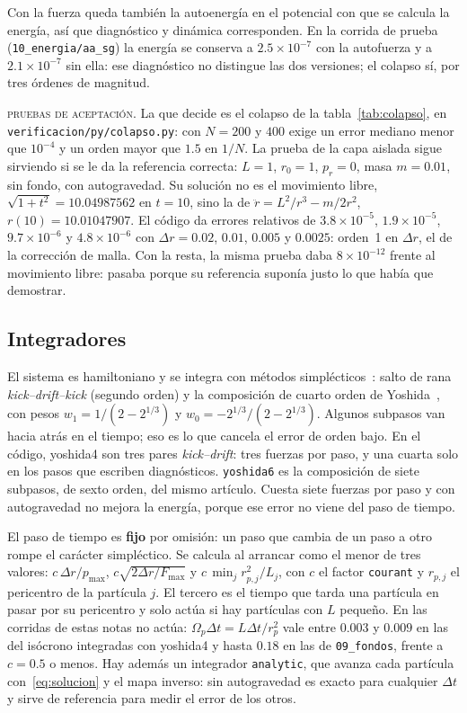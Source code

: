 \documentclass[11pt,a4paper]{article}
\newcommand{\rp}{p_r}
\begin{document}
Con la fuerza queda también la autoenergía en el potencial con que se calcula la energía,
así que diagnóstico y dinámica corresponden. En la corrida de prueba
(\texttt{10\_energia/aa\_sg}) la energía se conserva a $2.5\times10^{-7}$ con la
autofuerza y a $2.1\times10^{-7}$ sin ella: ese diagnóstico no distingue las dos
versiones; el colapso sí, por tres órdenes de magnitud.

\begin{aviso}
\textsc{pruebas de aceptación.} La que decide es el colapso de la
tabla~\ref{tab:colapso}, en \texttt{verificacion/py/colapso.py}: con $N=200$ y $400$
exige un error mediano menor que $10^{-4}$ y un orden mayor que $1.5$ en $1/N$. La
prueba de la capa aislada sigue sirviendo si se le da la referencia correcta: $L=1$,
$r_0=1$, $\rp=0$, masa $m=0.01$, sin fondo, con autogravedad. Su solución no es el
movimiento libre, $\sqrt{1+t^{2}}=10.04987562$ en $t=10$, sino la de
$\ddot r=L^{2}/r^{3}-m/2r^{2}$, $r(10)=10.01047907$. El código da errores relativos de
$3.8\times10^{-5}$, $1.9\times10^{-5}$, $9.7\times10^{-6}$ y $4.8\times10^{-6}$ con
$\Delta r=0.02$, $0.01$, $0.005$ y $0.0025$: orden~1 en $\Delta r$, el de la corrección
de malla. Con la resta, la misma prueba daba $8\times10^{-12}$ frente al movimiento libre:
pasaba porque su referencia suponía justo lo que había que demostrar.
\end{aviso}

\subsection{Integradores}

El sistema es hamiltoniano y se integra con métodos simplécticos~\cite{hairer2006}:
salto de rana \emph{kick--drift--kick} (segundo orden) y la composición de cuarto orden
de Yoshida~\cite{yoshida1990}, con pesos $w_1=1/(2-2^{1/3})$ y
$w_0=-2^{1/3}/(2-2^{1/3})$. Algunos subpasos van hacia atrás en el tiempo; eso es lo que
cancela el error de orden bajo. En el código, yoshida4 son tres pares \emph{kick--drift}:
tres fuerzas por paso, y una cuarta solo en los pasos que escriben diagnósticos.
\texttt{yoshida6} es la composición de siete subpasos, de sexto orden, del mismo artículo.
Cuesta siete fuerzas por paso y con autogravedad no mejora la energía, porque ese error no
viene del paso de tiempo.

El paso de tiempo es \textbf{fijo} por omisión: un paso que cambia de un paso a otro rompe
el carácter simpléctico. Se calcula al arrancar como el menor de tres valores:
$c\,\Delta r/p_{\max}$, $c\sqrt{2\Delta r/F_{\max}}$ y $c\,\min_j r_{p,j}^2/L_j$, con $c$ el
factor \texttt{courant} y $r_{p,j}$ el pericentro de la partícula $j$. El tercero es el
tiempo que tarda una partícula en pasar por su pericentro y solo actúa si hay partículas
con $L$ pequeño. En las corridas de estas notas no actúa: $\Omega_p\Delta
t=L\Delta t/r_p^2$ vale entre $0.003$ y $0.009$ en las del isócrono integradas con
yoshida4 y hasta $0.18$ en las de \texttt{09\_fondos}, frente a $c=0.5$ o menos. Hay
además un integrador \texttt{analytic}, que avanza cada
partícula con~\eqref{eq:solucion} y el mapa inverso: sin autogravedad es exacto para
cualquier $\Delta t$ y sirve de referencia para medir el error de los otros.
\end{document}
